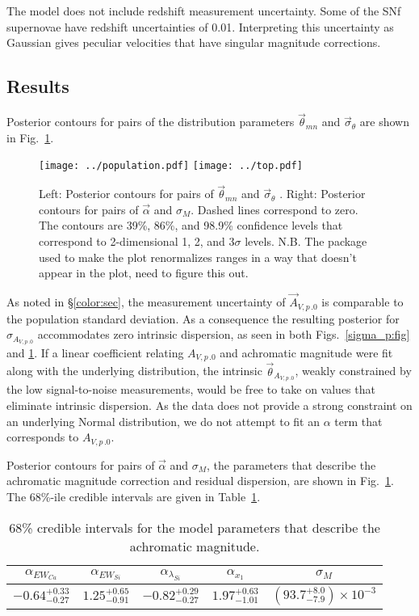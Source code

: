 \documentclass{aastex61}   	%
\begin{document}
The model does not include redshift measurement uncertainty.  Some of the SNf supernovae have redshift uncertainties of 0.01.  Interpreting
this uncertainty as Gaussian gives peculiar velocities that have singular magnitude corrections.

\subsection{Results}
Posterior contours for pairs of the distribution parameters
$\vec{\theta}_{\mathit{mn}}$ and
$\vec{\sigma}_{\theta}$ are shown in Fig.~\ref{confidence:fig}. 

\begin{figure}[htbp] %
   \centering
   \texttt{[image: ../population.pdf]}
   \texttt{[image: ../top.pdf]}
   \caption{Left: 
Posterior contours for pairs of
$\vec{\theta}_{\mathit{mn}}$ and
$\vec{\sigma}_{\theta}$ .  Right: Posterior contours for pairs of $\vec{\alpha}$ and
$\sigma_M$.  Dashed lines correspond to zero.
The contours are 39\%,  86\%, and 98.9\%   confidence levels that correspond to 2-dimensional 1, 2, and  3$\sigma$ levels.
N.B. The package used to make the plot renormalizes ranges in a way that doesn't appear in the plot, need
to figure  this out.
   \label{confidence:fig}}
\end{figure}

As noted in
\S\ref{color:sec}, the measurement uncertainty of ${\vec{A}_{V,p\,.0}}$ is comparable to the population standard deviation.  As a  consequence
the resulting
posterior for  $\sigma_{{A_{V,p\,.0}}}$  accommodates zero intrinsic dispersion, as
seen in both Figs.~\ref{sigma_p:fig} and \ref{confidence:fig}.  If 
a linear coefficient relating ${A_{V,p\,.0}}$
and achromatic magnitude were  fit along with the underlying distribution, the intrinsic  $\vec{\theta}_{A_{V,p\,.0}}$, weakly constrained by the 
low signal-to-noise measurements, would be
free to take on values that eliminate intrinsic dispersion.  As the data does not provide a strong constraint on an underlying Normal distribution,
we do not attempt to fit an $\alpha$ term that corresponds to  ${A_{V,p\,.0}}$.


Posterior contours for pairs  of $\vec{\alpha}$ and
$\sigma_M$, the parameters that describe the achromatic magnitude correction and residual dispersion, are shown in Fig.~\ref{confidence:fig}.
The 68\%-ile credible intervals are given in Table~\ref{magci:tab}.

\begin{table}
    \centering
    \caption{68\% credible intervals for the model parameters that describe the achromatic magnitude.}
    \label{magci:tab}
    \begin{tabular}{ccccc}
        \hline
		 $\alpha_{EW_{Ca}}$ & $\alpha_{EW_{Si}}$ & $\alpha_{\lambda_{Si}}$ & $\alpha_{x_1}$ & $\sigma_M$ \\ 
		\hline
		$-0.64^{+0.33}_{-0.27}$ & $1.25^{+0.65}_{-0.91}$ & $-0.82^{+0.29}_{-0.27}$ & $1.97^{+0.63}_{-1.01}$ & $\left( 93.7^{+8.0}_{-7.9} \right) \times 10^{-3}$ \\ 
		\hline
    \end{tabular}
\end{table}
\end{document}
